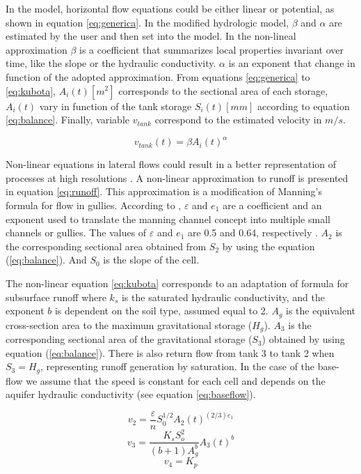 \documentclass[hess, manuscript]{copernicus}
\begin{document}
In the model, horizontal flow equations could be either linear or potential, as shown in equation \ref{eq:generica}. In the modified hydrologic model, $\beta$ and $\alpha$ are estimated by the user and then set into the model. In the non-lineal approximation $\beta$ is a coefficient that summarizes local properties invariant over time, like the slope or the hydraulic conductivity. $\alpha$ is an exponent that change in function of the adopted approximation. From equations \ref{eq:generica} to \ref{eq:kubota}, $A_i(t) [m^2]$ corresponds to the sectional area of each storage, $A_i(t)$ vary in function of the tank storage $S_i(t) [mm]$ according to equation \ref{eq:balance}. Finally, variable $v_{tank}$ correspond to the estimated velocity in $m/s$.

\begin{equation}
 v_{tank}(t) = \beta A_i(t) ^{\alpha} 
    \label{eq:generica}
\end{equation}

Non-linear equations in lateral flows could result in a better representation of processes at high resolutions \citep{Beven1981, Kirkby1967}.  A non-linear approximation to runoff is presented in equation \ref{eq:runoff}.   This approximation is a modification of Manning's formula for flow in gullies. According to \citet{Foster1984}, $\varepsilon$ and $e_1$ are a coefficient and an exponent used to translate the manning channel concept into multiple small channels or gullies. The values of $\varepsilon$ and $e_1$ are 0.5 and 0.64, respectively \citep{Foster1984}. $A_2$ is the corresponding sectional area obtained from $S_2$ by using the equation (\ref{eq:balance}). And $S_0$ is the slope of the cell.    

The non-linear equation \ref{eq:kubota} corresponds to an adaptation of \citet{Kubota1995} formula for subsurface runoff where $k_s$ is the saturated hydraulic conductivity, and the exponent $b$ is dependent on the soil type, assumed equal to 2.  $A_g$ is the equivalent cross-section area to the maximum gravitational storage ($H_g$).  $A_3$ is the corresponding sectional area of the gravitational storage ($S_3$) obtained by using equation (\ref{eq:balance}).  There is also return flow from tank 3 to tank 2 when $S_3=H_g$, representing runoff generation by saturation.  In the case of the base-flow we assume that the speed is constant for each cell and depends on the aquifer hydraulic conductivity (see equation \ref{eq:baseflow}).

\begin{equation}
 v_{2} = \frac{\varepsilon}{n}  S_{0}^{1/2} A_{2}(t)^{(2/3) e_1}
    \label{eq:runoff}
\end{equation}
\begin{equation}
 v_3 = \frac{K_s S_{o}^{2}}{(b+1) A_{g}^{b}} A_{3}(t)^{b}
    \label{eq:kubota}
\end{equation}
\begin{equation}
    v_4 = K_p
    \label{eq:baseflow}
\end{equation}
\end{document}

